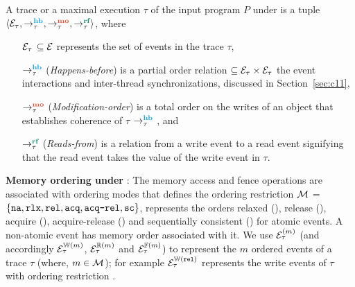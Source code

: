 \begin{definition}[Trace]\newline
{}
	A trace or a maximal execution $\tau$ of the input 
	program $P$ under \cc is a tuple 
	$\langle \events_\tau, \setHB, \setMO, \setRF \rangle$, where
	\begin{itemize}[label=sethb,align=left,leftmargin=*]
		\item [$\mathcal{E}_\tau$] $\subseteq \mathcal{E}$ represents the set of 
			events in the trace $\tau$,
		\item [$\setHB$] ({\em Happens-before}) is a partial order relation
			$\subseteq \mathcal{E}_\tau \times \mathcal{E}_\tau$
                         the event interactions and inter-thread
			synchronizations, discussed in Section~\ref{sec:c11},
		\item [$\setMO$] ({\em Modification-order}) is a total order on the
			writes of an object that establishes coherence of $\tau$ 
			\wrt $\setHB$ , and
		\item [$\setRF$] ({\em Reads-from}) is a relation from a write event to
			a read event signifying that the read event takes the value of 
			the write event in $\tau$.
	\end{itemize}
\end{definition}

\noindent
{\bf Memory ordering under \cc}: 
The memory access and fence operations are
associated with ordering modes
that defines the ordering restriction 
%
$\mathcal{M}$ = $\{ \texttt{na}, \texttt{rlx}, \texttt{rel}, \texttt{acq}, \texttt{acq-rel}, \texttt{sc} \}$, 
represents the orders relaxed (\rlx), release (\rel), acquire (\acq),
acquire-release (\acqrel) and sequentially consistent (\sc) for
atomic events. A non-atomic event has \na memory order associated with 
it.
%
We use $\mathcal{E}^{(m)}_\tau$ (and accordingly $\mathcal{E}^{\mathbb{W}(m)}_\tau$, 
$\mathcal{E}^{\mathbb{R}(m)}_\tau$ and $\mathcal{E}^{\mathbb{F}(m)}_\tau$) to represent the $m$
ordered events of a trace $\tau$ (where, $m \in \mathcal{M}$);
for example $\mathcal{E}^{\mathbb{W}(\texttt{rel})}_\tau$ represents the write events of 
$\tau$ with ordering restriction \rel. 

